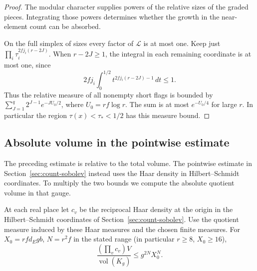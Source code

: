 \begin{proof}

The modular character supplies powers of the relative sizes of the graded pieces. Integrating those powers determines whether the growth in the near-element count can be absorbed.

On the full simplex of sizes every factor of \(\mathcal L\)
is at most one. Keep just \(\prod_i\tau_i^{2fj_i(r-2J)}\).
When \(r-2J\ge1\), the integral in each remaining coordinate
is at most one, since
\[
 2f j_i\int_0^{1/2} t^{2fj_i(r-2J)-1}\,dt\le1 .
\]
Thus the relative measure of all nonempty short flags is
bounded by \(\sum_{J=1}^q2^{J-1}e^{-JU_0/2}\), where
\(U_0=rf\log r\). The sum is at most \(e^{-U_0/4}\) for
large \(r\). In particular the region \(\tau(x)<\tau_*<1/2\)
has this measure bound.
\end{proof}

\subsection{Absolute volume in the pointwise estimate}

The preceding estimate is relative to the total volume. The pointwise estimate in Section~\ref{sec:count-sobolev} instead uses the Haar density in Hilbert--Schmidt coordinates. To multiply the two bounds we compute the absolute quotient volume in that gauge.
\begin{lemma}\label{lem:deep-volume-estimate}
At each real place let \(c_v\) be the reciprocal Haar density
at the origin in the Hilbert--Schmidt coordinates of
Section~\ref{sec:count-sobolev}. Use the quotient measure induced
by these Haar measures and the chosen finite measures. For \(X_0=rf d_Egb\), \(N=r^2 f\) in the stated
range (in particular \(r\ge8\), \(X_0\ge16\)),
\[
 \frac{(\prod_v c_v)V}{\operatorname{vol}(K_g)}
                 \le g^{2N}X_0^N.
\]
\end{lemma}


